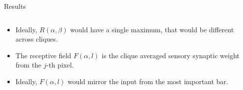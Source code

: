 \documentclass[final,hyperref={pdfpagelabels=false}]{beamer}
\begin{document}
\begin{frame}
\begin{columns}
\begin{column}{.60\textwidth}
\begin{minipage}[T]{.95\textwidth}
{\begin{minipage}[T]{.55\textwidth}
\begin{block}{Results}
\begin{columns}
\begin{column}[T]{1\textwidth}
\begin{itemize}
							\item Ideally, $R(\alpha, \beta)$ would have a single maximum, that would be different across cliques.
							
							\item The receptive field $F(\alpha, l)$ is the clique averaged sensory synaptic weight from the $j$-th pixel.
							
							\item Ideally, $F(\alpha, l)$ would mirror the input from the most important bar.
						\end{itemize}
						
					\end{column}
					
				\end{columns}
			\end{block}
			\end{minipage}			
			\begin{minipage}[T]{.45\textwidth}
				\vspace{1\baselineskip}
				\begin{column}[T]{1\textwidth}
					\begin{figure}

\end{figure}
\end{column}
\end{minipage}}
\end{minipage}
\end{column}
\end{columns}
\end{frame}
\end{document}
